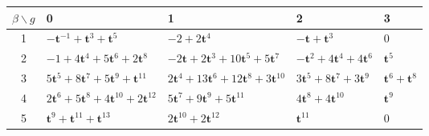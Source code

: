 \begin{tabular}{c|llll}
\hline
$\beta \backslash g$ & 0 & 1 & 2 & 3 \\
\hline
1 & $-\mathbf{t}^{-1}+\mathbf{t}^{3}+\mathbf{t}^{5}$ & $-2+2\mathbf{t}^{4}$ & $-\mathbf{t}+\mathbf{t}^{3}$ & $0$ \\
2 & $-1+4\mathbf{t}^{4}+5\mathbf{t}^{6}+2\mathbf{t}^{8}$ & $-2\mathbf{t}+2\mathbf{t}^{3}+10\mathbf{t}^{5}+5\mathbf{t}^{7}$ & $-\mathbf{t}^{2}+4\mathbf{t}^{4}+4\mathbf{t}^{6}$ & $\mathbf{t}^{5}$ \\
3 & $5\mathbf{t}^{5}+8\mathbf{t}^{7}+5\mathbf{t}^{9}+\mathbf{t}^{11}$ & $2\mathbf{t}^{4}+13\mathbf{t}^{6}+12\mathbf{t}^{8}+3\mathbf{t}^{10}$ & $3\mathbf{t}^{5}+8\mathbf{t}^{7}+3\mathbf{t}^{9}$ & $\mathbf{t}^{6}+\mathbf{t}^{8}$ \\
4 & $2\mathbf{t}^{6}+5\mathbf{t}^{8}+4\mathbf{t}^{10}+2\mathbf{t}^{12}$ & $5\mathbf{t}^{7}+9\mathbf{t}^{9}+5\mathbf{t}^{11}$ & $4\mathbf{t}^{8}+4\mathbf{t}^{10}$ & $\mathbf{t}^{9}$ \\
5 & $\mathbf{t}^{9}+\mathbf{t}^{11}+\mathbf{t}^{13}$ & $2\mathbf{t}^{10}+2\mathbf{t}^{12}$ & $\mathbf{t}^{11}$ & $0$ \\
\hline
\end{tabular}
